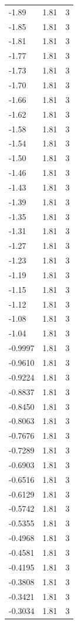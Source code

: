 \begin{longtable}{lrr}
  -1.89 & 1.81 & 3 \\
  -1.85 & 1.81 & 3 \\
  -1.81 & 1.81 & 3 \\
  -1.77 & 1.81 & 3 \\
  -1.73 & 1.81 & 3 \\
  -1.70 & 1.81 & 3 \\
  -1.66 & 1.81 & 3 \\
  -1.62 & 1.81 & 3 \\
  -1.58 & 1.81 & 3 \\
  -1.54 & 1.81 & 3 \\
  -1.50 & 1.81 & 3 \\
  -1.46 & 1.81 & 3 \\
  -1.43 & 1.81 & 3 \\
  -1.39 & 1.81 & 3 \\
  -1.35 & 1.81 & 3 \\
  -1.31 & 1.81 & 3 \\
  -1.27 & 1.81 & 3 \\
  -1.23 & 1.81 & 3 \\
  -1.19 & 1.81 & 3 \\
  -1.15 & 1.81 & 3 \\
  -1.12 & 1.81 & 3 \\
  -1.08 & 1.81 & 3 \\
  -1.04 & 1.81 & 3 \\
  -0.9997 & 1.81 & 3 \\
  -0.9610 & 1.81 & 3 \\
  -0.9224 & 1.81 & 3 \\
  -0.8837 & 1.81 & 3 \\
  -0.8450 & 1.81 & 3 \\
  -0.8063 & 1.81 & 3 \\
  -0.7676 & 1.81 & 3 \\
  -0.7289 & 1.81 & 3 \\
  -0.6903 & 1.81 & 3 \\
  -0.6516 & 1.81 & 3 \\
  -0.6129 & 1.81 & 3 \\
  -0.5742 & 1.81 & 3 \\
  -0.5355 & 1.81 & 3 \\
  -0.4968 & 1.81 & 3 \\
  -0.4581 & 1.81 & 3 \\
  -0.4195 & 1.81 & 3 \\
  -0.3808 & 1.81 & 3 \\
  -0.3421 & 1.81 & 3 \\
  -0.3034 & 1.81 & 3 \\

\end{longtable}
